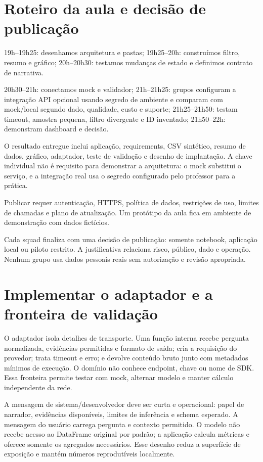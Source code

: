 \section{Roteiro da aula e decisão de publicação}

19h--19h25: desenhamos arquitetura e pastas; 19h25--20h: construímos filtro, resumo e gráfico; 20h--20h30: testamos mudanças de estado e definimos contrato de narrativa.

20h30--21h: conectamos mock e validador; 21h--21h25: grupos configuram a integração API opcional usando segredo de ambiente e comparam com mock/local segundo dado, qualidade, custo e suporte; 21h25--21h50: testam timeout, amostra pequena, filtro divergente e ID inventado; 21h50--22h: demonstram dashboard e decisão.

O resultado entregue inclui aplicação, requirements, CSV sintético, resumo de dados, gráfico, adaptador, teste de validação e desenho de implantação. A chave individual não é requisito para demonstrar a arquitetura: o mock substitui o serviço, e a integração real usa o segredo configurado pelo professor para a prática.

Publicar requer autenticação, HTTPS, política de dados, restrições de uso, limites de chamadas e plano de atualização. Um protótipo da aula fica em ambiente de demonstração com dados fictícios.

Cada squad finaliza com uma decisão de publicação: somente notebook, aplicação local ou piloto restrito. A justificativa relaciona risco, público, dado e operação. Nenhum grupo usa dados pessoais reais sem autorização e revisão apropriada.

\section{Implementar o adaptador e a fronteira de validação}

O adaptador isola detalhes de transporte. Uma função interna recebe pergunta normalizada, evidências permitidas e formato de saída; cria a requisição do provedor; trata timeout e erro; e devolve conteúdo bruto junto com metadados mínimos de execução. O domínio não conhece endpoint, chave ou nome de SDK. Essa fronteira permite testar com mock, alternar modelo e manter cálculo independente da rede.

A mensagem de sistema/desenvolvedor deve ser curta e operacional: papel de narrador, evidências disponíveis, limites de inferência e schema esperado. A mensagem do usuário carrega pergunta e contexto permitido. O modelo não recebe acesso ao DataFrame original por padrão; a aplicação calcula métricas e oferece somente os agregados necessários. Esse desenho reduz a superfície de exposição e mantém números reprodutíveis localmente.

